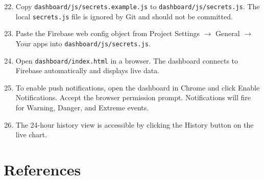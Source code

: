 \documentclass[a4paper,10pt,conference,onecolumn]{IEEEtran}
\begin{document}
\begin{enumerate}
  \setcounter{enumi}{21}
  \item Copy \texttt{dashboard/js/secrets.example.js} to
        \texttt{dashboard/js/secrets.js}. The local \texttt{secrets.js} file is
        ignored by Git and should not be committed.
  \item Paste the Firebase web config object from Project Settings $\to$
        General $\to$ Your apps into \texttt{dashboard/js/secrets.js}.
  \item Open \texttt{dashboard/index.html} in a browser. The dashboard
        connects to Firebase automatically and displays live data.
  \item To enable push notifications, open the dashboard in Chrome and click
        Enable Notifications. Accept the browser permission prompt.
        Notifications will fire for Warning, Danger, and Extreme events.
  \item The 24-hour history view is accessible by clicking the History button
        on the live chart.
\end{enumerate}

\section*{References}
\label{sec:references}
\end{document}
